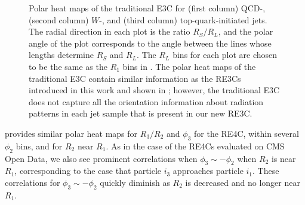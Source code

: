 \begin{figure}
{    }
    \caption[Polar heat maps of the traditional three-point energy correlator on QCD, \(W\), and top jets.]{
        Polar heat maps of the traditional E3C for (first column) QCD-, (second column) \(W\)-, and (third column) top-quark-initiated jets.
        The radial direction in each plot is the ratio \(R_S/R_L\), and the polar angle of the plot corresponds to the angle between the lines whose lengths determine \(R_S\) and \(R_L\).
        The \(R_L\) bins for each plot are chosen to be the same as the \(R_1\) bins in .
        The polar heat maps of the traditional E3C contain similar information as the RE3Cs introduced in this work and shown in ;
        however, the traditional E3C does not capture all the orientation information about radiation patterns in each jet sample that is present in our new RE3C.
    }
	\label{fig:pythia_old_e3cs}%
\end{figure}

 provides similar polar heat maps for \(R_3/R_2\) and \(\phi_3\) for the RE4C, within several \(\phi_2\) bins, and for \(R_2\) near \(R_1\).
%
As in the case of the RE4Cs evaluated on CMS Open Data, we also see prominent correlations when \(\phi_3 \sim -\phi_2\) when \(R_2\) is near \(R_1\), corresponding to the case that particle \(i_3\) approaches particle \(i_1\).
%
These correlations for \(\phi_3 \sim -\phi_2\) quickly diminish as \(R_2\) is decreased and no longer near \(R_1\).

